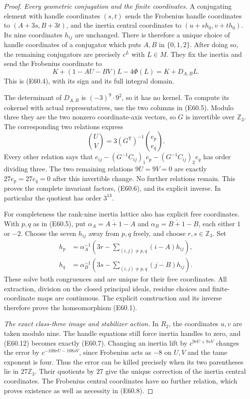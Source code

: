 \begin{proof}
\emph{Every geometric conjugation and the finite coordinates.}
A conjugating element with handle coordinates $(s,t)$
sends the Frobenius handle coordinates to
$(A+3s,B+3t)$, and the inertia central coordinates to
$(u+s h_0,v+t h_0)$. Its nine coordinates $h_{ij}$ are
unchanged. There is therefore a unique choice of handle
coordinates of a conjugator which puts $A,B$ in
$\{0,1,2\}$. After doing so, the remaining conjugators
are precisely $c^L$ with $L\in M$.
They fix the inertia and send the Frobenius coordinate to
\[
      K+(1-AU-BV)L-4\Phi(L)=K+D_{A,B}L.
 \tag{E60.13}
\]
This is (E60.4), with its sign and its full integral domain.

The determinant of $D_{A,B}$ is $(-3)^9\cdot9^2$,
so it has no kernel. To compute its cokernel with actual
representatives, use the two columns in (E60.5).
Modulo three they are the two nonzero coordinate-axis
vectors, so $G$ is invertible over $\mathbb Z_3$.
The corresponding two relations express
\[
       \binom U V=3(G^{\mathsf T})^{-1}\binom{e_p}{e_q}.
 \tag{E60.14}
\]
Every other relation says that
$e_{ij}-(G^{-1}C_{ij})_1e_p-(G^{-1}C_{ij})_2e_q$
has order dividing three. The two remaining relations
$9U=9V=0$ are exactly $27e_p=27e_q=0$ after this
invertible change. No further relations remain.
This proves the complete invariant factors, (E60.6),
and its explicit inverse. In particular the quotient has
order $3^{13}$.

For completeness the rank-nine inertia lattice also has
explicit free coordinates. With $p,q$ as in (E60.5), put
$\alpha_A=\overline{A+1}-A$ and
$\alpha_B=\overline{B+1}-B$, each either $1$ or $-2$.
Choose the seven $h_{ij}$ away from $p,q$ freely, and
choose $r,s\in\mathbb Z_3$. Set
\[
 \begin{split}
 h_p&=\alpha_A^{-1}
       \left(3r-\sum_{(i,j)\ne p,q}(i-A)h_{ij}\right),\\
 h_q&=\alpha_B^{-1}
       \left(3s-\sum_{(i,j)\ne p,q}(j-B)h_{ij}\right).
 \end{split}
 \tag{E60.15}
\]
These solve both congruences and are unique for their
free coordinates. All extraction, division on the closed
principal ideals, residue choices and finite-coordinate
maps are continuous. The explicit construction and its
inverse therefore prove the homeomorphism (E60.1).

\emph{The exact class-three image and stabilizer action.}
In $R_2$, the coordinates $u,v$ are taken modulo nine.
The handle equations still force inertia handles to zero,
and (E60.12) becomes exactly (E60.7).
Changing an inertia lift by $c^{9rU+9sV}$ changes the
error by $c^{-108rU-108sV}$, since Frobenius acts as
$-8$ on $U,V$ and the tame exponent is four.
Thus the error can be killed precisely when its two
parentheses lie in $27\mathbb Z_3$.
Their quotients by $27$ give the unique correction of
the inertia central coordinates. The Frobenius central
coordinates have no further relation, which proves
existence as well as necessity in (E60.8).


\end{proof}
